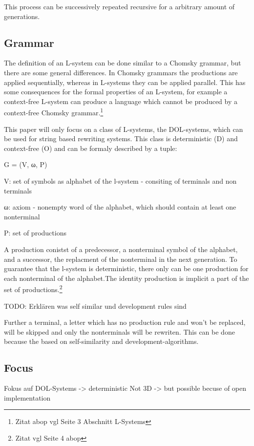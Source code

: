 \documentclass[english]{cpp-hmwk}
\begin{document}
This process can be successively repeated recursive for a arbitrary amount of generations.
\subsection{Grammar}
\label{section:grammar}
The definition of an L-system can be done similar to a Chomsky grammar, but there are some general differences. In Chomsky grammars the productions are applied sequentially, whereas in L-systems they can be applied parallel. This has some consequences for the formal properties of an L-system, for example a context-free L-system can produce a language which cannot be produced by a context-free Chomsky grammar.\footnote{Zitat abop vgl Seite 3  Abschnitt L-Systems}

\noindent This paper will only focus on a class of L-systems, the DOL-systems, which can be used for string based rewriting systems. This class is deterministic (D) and context-free (O) and can be formaly described  by a tuple:

\begin{center}
G = (V, ω, P)
\end{center}

V: set of symbols as alphabet of the l-system - consiting of terminals and non terminals

ω: axiom - nonempty word of the alphabet, which should contain at least one nonterminal

P: set of productions

\medskip
\noindent A production conistst of a predecessor, a nonterminal symbol of the alphabet, and a successor, the replacment of the nonterminal in the next generation.
To guarantee that the l-system is deterministic, there only can be one production for each nonterminal of the alphabet.The identity production is implicit a part of the set of productions.\footnote{Zitat vgl Seite 4 abop}

\bigskip

TODO: Erklären was self similar und development rules sind



 Further a terminal, a letter which has no production rule and won't be replaced, will be skipped and only the nonterminals will be rewriten.
This can be done because the  based on self-similarity and development-algorithms.


\subsection{Focus}
Fokus auf DOL-Systems -> deterministic
Not 3D -> but possible becuse of open implementation
\end{document}
